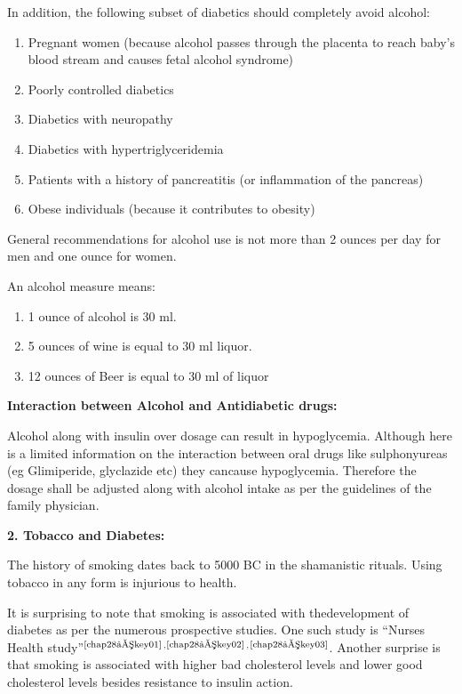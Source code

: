 In addition, the following subset of diabetics should completely avoid alcohol:

\vspace{-\topsep}
\begin{enumerate}[•]
\itemsep=0pt
\item Pregnant women (because alcohol passes through the placenta to reach baby’s blood stream and causes fetal alcohol syndrome)
\item Poorly controlled diabetics
\item Diabetics with neuropathy
\item Diabetics with hypertriglyceridemia
\item Patients with a history of pancreatitis (or inflammation of the pancreas)
\item Obese individuals (because it contributes to obesity)
\end{enumerate}
\vspace{-\topsep}

General recommendations for alcohol use is not more than 2 ounces per day for men and one ounce for women.

\noindent An alcohol measure means:

\vspace{-\topsep}
\begin{enumerate}[•]
\itemsep=0pt
\item 1 ounce of alcohol is 30 ml.
\item 5 ounces of wine is equal to 30 ml liquor.
\item 12 ounces of Beer is equal to 30 ml of liquor
\end{enumerate}
\vspace{-\topsep}

\noindent\textbf{Interaction between Alcohol and Antidiabetic drugs:}

Alcohol along with insulin over dosage can result in hypoglycemia. Although here is a limited information on the interaction between oral drugs like sulphonyureas (eg Glimiperide, glyclazide etc) they can\break cause hypoglycemia. Therefore the dosage shall be adjusted along with alcohol intake as per the guidelines of the family physician.

{\noindent\Large\textbf{2. Tobacco and Diabetes:}}

The history of smoking dates back to 5000 BC in the shamanistic rituals. Using tobacco in any form is injurious to health.

It is surprising to note that smoking is associated with the\break development of diabetes as per the numerous prospective studies. One such study is “Nurses Health study”$^{\text{\cite{chap28–key01}}}$$^,$$^{\text{\cite{chap28–key02}}}$$^,$$^{\text{\cite{chap28–key03}}}$. Another surprise is that smoking is associated with higher bad cholesterol levels and lower good cholesterol levels besides resistance to insulin action.

